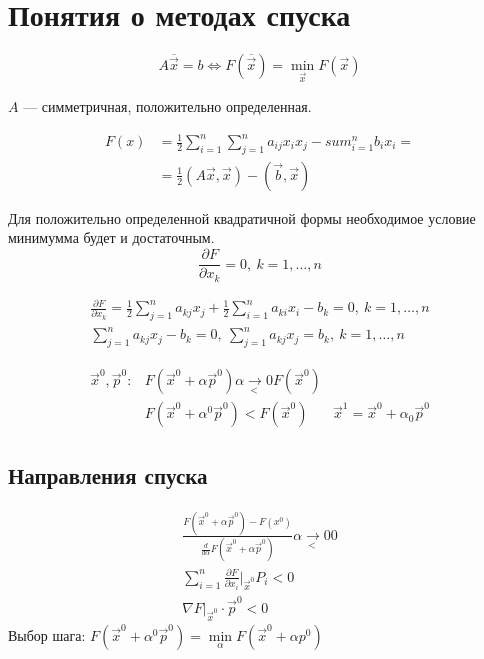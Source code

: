 \section{Понятия о методах спуска}

\[  
  A \overline{\vec{x}} = b \iff F(\overline{\vec{x}}) = \min_{\vec{x}}
  F(\vec{x})
\]

$A$ --- симметричная, положительно определенная.

\begin{align*}
  F(x) &= \frac 12 \sum_{i = 1}^n \sum_{j = 1}^n a_{ij} x_i x_j - sum_{i = 1}^n b_i x_i =\\ 
       &= \frac 12 (A\vec{x}, \vec{x}) - (\vec{b}, \vec{x})
\end{align*}

Для положительно определенной квадратичной формы необходимое условие минимумма
будет и достаточным.
\[
  \frac{\partial F}{\partial x_k} = 0,\ k = 1, \dotsc, n
\]

\begin{gather*}
  \frac{\partial F}{\partial x_k} = \frac 12 \sum_{j = 1}^n a_{kj}x_j + \frac 12
  \sum_{i = 1}^n a_{ki}x_i - b_k = 0,\ k = 1,\dotsc, n \\
  \sum_{j = 1}^n a_{kj} x_j - b_k = 0,\ \sum_{j = 1}^n a_{kj}x_j = b_k,\ k = 1,
  \dotsc, n
\end{gather*}

\begin{align*}
  \vec{x}^0, \vec{p}^0: &F(\vec{x}^0 + \alpha \vec{p}^0) \underset{<}{\alpha \to
                          0} F(\vec{x}^0)\\
                        &F(\vec{x}^0 + \alpha^0 \vec{p}^0) < F(\vec{x}^0)
                        &\vec{x}^1 = \vec{x}^0 + \alpha_0 \vec{p}^0
\end{align*}

\subsection{Направления спуска}
\begin{gather*}
  \frac{F(\vec{x}^0 + \alpha \vec{p}^0) - F(x^0)}{\frac{d}{d\alpha} F(\vec{x}^0
    + \alpha \vec{p}^0)} \underset{<}{\alpha \to 0} 0 \\
  \sum_{i = 1}^n \frac{\partial F}{\partial x_i} |_{\vec{x}^0} P_i < 0\\
  \nabla F |_{\vec{x}^0} \cdot \vec{p}^0 < 0
\end{gather*}
Выбор шага: $F(\vec x^0 + \alpha^0 \vec p^0) = \min\limits_\alpha F(\vec x^0 + \alpha p^0)$

